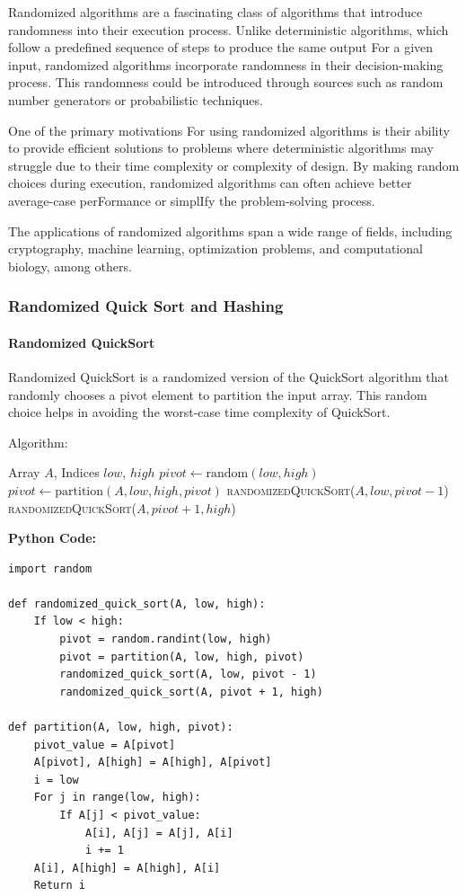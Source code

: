 \documentclass[12pt]{book} %
\begin{document}
Randomized algorithms are a fascinating class of algorithms that introduce randomness into their execution process. Unlike deterministic algorithms, which follow a predefined sequence of steps to produce the same output For a given input, randomized algorithms incorporate randomness in their decision-making process. This randomness could be introduced through sources such as random number generators or probabilistic techniques.

One of the primary motivations For using randomized algorithms is their ability to provide efficient solutions to problems where deterministic algorithms may struggle due to their time complexity or complexity of design. By making random choices during execution, randomized algorithms can often achieve better average-case perFormance or simplIfy the problem-solving process.

The applications of randomized algorithms span a wide range of fields, including cryptography, machine learning, optimization problems, and computational biology, among others.
\FloatBarrier
\subsubsection{Randomized Quick Sort and Hashing}
\paragraph{Randomized QuickSort}

Randomized QuickSort is a randomized version of the QuickSort algorithm that randomly chooses a pivot element to partition the input array. This random choice helps in avoiding the worst-case time complexity of QuickSort.

Algorithm:
\FloatBarrier
\begin{algorithm}
\caption{Randomized QuickSort}
\begin{algorithmic}[1]
\State Array $A$, Indices $low$, $high$
        \State $pivot \gets \text{random}(low, high)$
        \State $pivot \gets \text{partition}(A, low, high, pivot)$
        \State \textsc{randomizedQuickSort}($A, low, pivot-1$)
        \State \textsc{randomizedQuickSort}($A, pivot+1, high$)
    \EndIf
\EndFunction
\end{algorithmic}
\end{algorithm}

\FloatBarrier
\textbf{Python Code:}
\FloatBarrier
\begin{verbatim}
import random

def randomized_quick_sort(A, low, high):
    If low < high:
        pivot = random.randint(low, high)
        pivot = partition(A, low, high, pivot)
        randomized_quick_sort(A, low, pivot - 1)
        randomized_quick_sort(A, pivot + 1, high)

def partition(A, low, high, pivot):
    pivot_value = A[pivot]
    A[pivot], A[high] = A[high], A[pivot]
    i = low
    For j in range(low, high):
        If A[j] < pivot_value:
            A[i], A[j] = A[j], A[i]
            i += 1
    A[i], A[high] = A[high], A[i]
    Return i
\end{verbatim}
\FloatBarrier
\end{document}
